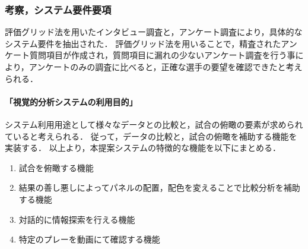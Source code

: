 \documentclass[sotsuron]{kuee}
\begin{document}
			\subsubsection{考察，システム要件要項}
				評価グリッド法を用いたインタビュー調査と，アンケート調査により，具体的なシステム要件を抽出された．
				評価グリッド法を用いることで，精査されたアンケート質問項目が作成され，質問項目に漏れの少ないアンケート調査を行う事により，アンケートのみの調査に比べると，正確な選手の要望を確認できたと考えられる．
					\paragraph {「視覚的分析システムの利用目的」}
						システム利用用途として様々なデータとの比較と，試合の俯瞰の要素が求められていると考えられる．
						従って，データの比較と，試合の俯瞰を補助する機能を実装する．
						以上より，本提案システムの特徴的な機能を以下にまとめる．
						\begin{enumerate}	
							\item 試合を俯瞰する機能
							\item 結果の善し悪しによってパネルの配置，配色を変えることで比較分析を補助する機能
							\item 対話的に情報探索を行える機能
							\item 特定のプレーを動画にて確認する機能
						\end{enumerate}
\end{document}
